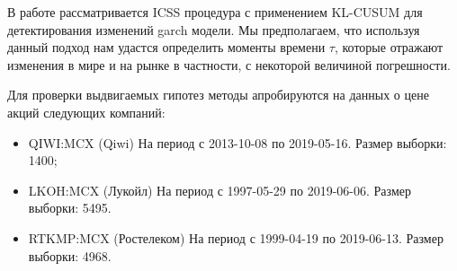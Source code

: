 \documentclass[a4paper,14pt,russian]{extarticle}
\begin{document}
	\par
	В работе рассматривается ICSS процедура с применением KL-CUSUM для детектирования изменений garch модели. Мы предполагаем, что используя данный подход нам удастся определить моменты времени $\tau$, которые отражают изменения в мире и на рынке в частности, с некоторой величиной погрешности.
	\par
	Для проверки выдвигаемых гипотез методы апробируются на данных о цене акций следующих компаний:
	\begin{itemize}
		\item QIWI:MCX (Qiwi) На период с 2013-10-08 по 2019-05-16. Размер выборки: 1400;
		\item LKOH:MCX (Лукойл) На период с 1997-05-29 по 2019-06-06. Размер выборки: 5495.
		\item RTKMP:MCX (Ростелеком) На период с 1999-04-19 по 2019-06-13. Размер выборки: 4968.
	\end{itemize}
	
	\clearpage
\end{document}
